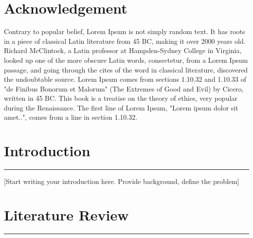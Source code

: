 \documentclass[a4paper, 12pt, twoside]{article}
\begin{document}
\section*{Acknowledgement}

Contrary to popular belief, Lorem Ipsum is not simply random text. It has roots in a piece of classical Latin literature from 45 BC, making it over 2000 years old. Richard McClintock, a Latin professor at Hampden-Sydney College in Virginia, looked up one of the more obscure Latin words, consectetur, from a Lorem Ipsum passage, and going through the cites of the word in classical literature, discovered the undoubtable source. Lorem Ipsum comes from sections 1.10.32 and 1.10.33 of "de Finibus Bonorum et Malorum" (The Extremes of Good and Evil) by Cicero, written in 45 BC. This book is a treatise on the theory of ethics, very popular during the Renaissance. The first line of Lorem Ipsum, "Lorem ipsum dolor sit amet..", comes from a line in section 1.10.32.

\clearpage

\begin{singlespace}
    \tableofcontents
    \clearpage
    \listoffigures
    \clearpage
    \listoftables
\end{singlespace}

\clearpage


\section{Introduction} 
\hrule
\vspace{0.5cm}

[Start writing your introduction here. Provide background, define the problem]

\clearpage

\section{Literature Review} 
\hrule
\vspace{0.5cm}
\end{document}
